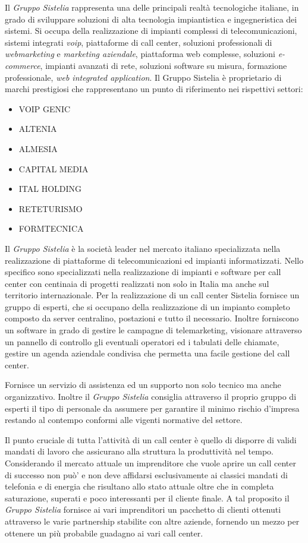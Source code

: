 Il \textit{Gruppo Sistelia} rappresenta una delle principali realtà tecnologiche italiane, in grado di sviluppare soluzioni di alta tecnologia impiantistica e ingegneristica dei sistemi.
Si occupa della realizzazione di impianti complessi di telecomunicazioni, sistemi integrati \textit{voip}, piattaforme di call center, soluzioni professionali di \textit{webmarketing} e \textit{marketing aziendale}, piattaforma web complesse, soluzioni \textit{e-commerce}, impianti  avanzati di rete, soluzioni software su misura, formazione professionale, \textit{web integrated application}.
Il Gruppo Sistelia è proprietario di marchi prestigiosi che rappresentano un punto di riferimento nei rispettivi settori:
\begin{itemize}
\item VOIP GENIC
\item  ALTENIA
\item  ALMESIA 
\item  CAPITAL MEDIA
\item  ITAL HOLDING
\item RETETURISMO
\item FORMTECNICA
\end{itemize}

Il \textit{Gruppo Sistelia} è la società leader nel mercato italiano specializzata nella realizzazione di piattaforme di telecomunicazioni ed impianti informatizzati. Nello specifico sono specializzati nella realizzazione di impianti e software per call center con centinaia di progetti realizzati non solo in Italia ma anche sul territorio internazionale.
Per la realizzazione di un call center Sistelia fornisce un gruppo di esperti, che si occupano della realizzazione di un impianto completo composto da server centralino, postazioni e tutto il necessario.
Inoltre forniscono un software in grado di gestire le campagne di telemarketing, visionare attraverso un pannello di controllo gli eventuali operatori ed i tabulati delle chiamate, gestire un agenda aziendale condivisa che permetta una facile gestione del call center.

Fornisce un servizio di assistenza ed un supporto non solo tecnico ma anche organizzativo. Inoltre il \textit{Gruppo Sistelia} consiglia attraverso il proprio gruppo di esperti il tipo di personale da assumere per garantire il minimo rischio d'impresa restando al contempo conformi alle vigenti normative del settore.

Il punto cruciale di tutta l'attività di un call center è quello di disporre di validi mandati di lavoro che assicurano alla struttura la produttività nel tempo.
Considerando il mercato attuale un imprenditore che vuole aprire un call center di successo non può' e non deve affidarsi esclusivamente ai classici mandati di telefonia e di energia che risultano allo stato attuale oltre che in completa saturazione, superati e poco interessanti per il cliente finale. 
A tal proposito il \textit{Gruppo Sistelia} fornisce ai vari imprenditori un pacchetto di clienti ottenuti attraverso le varie partnership stabilite con altre aziende, fornendo un mezzo per ottenere un più probabile guadagno ai vari call center. 


